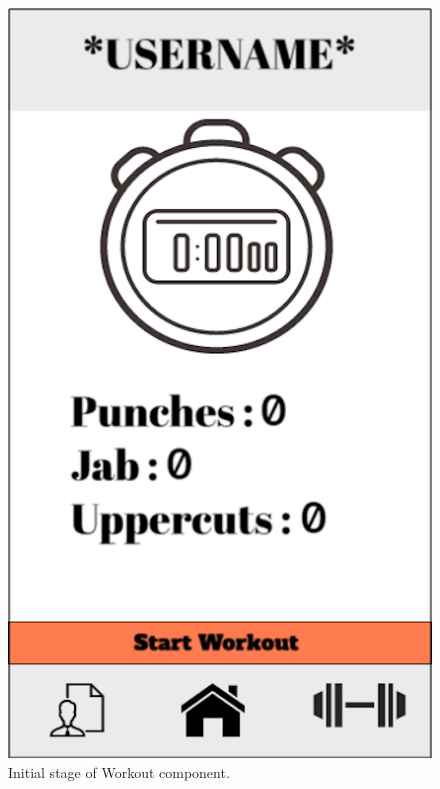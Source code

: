 \documentclass[a4paper,12pt]{report}
\begin{document}
    \begin{figure}[h]
    \begin{center}
        \includegraphics[scale=.5]{images/workoutBorder.png}
        \caption{Initial stage of Workout component.}
        \label{fig:isWComponent}
        \end{center}
    \end{figure}
\end{document}
